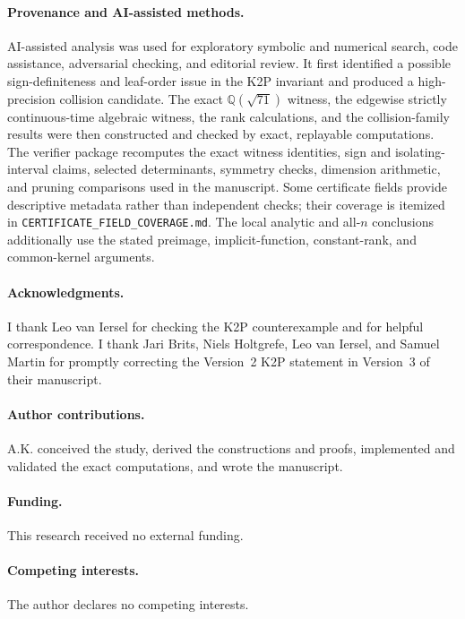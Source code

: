 \documentclass[11pt]{article}
\theoremstyle{remark}\newtheorem{remark}[theorem]{Remark}
\begin{document}
\paragraph{Provenance and AI-assisted methods.}
AI-assisted analysis was used for exploratory symbolic and numerical search, code assistance, adversarial checking, and editorial review. It first identified a possible sign-definiteness and leaf-order issue in the K2P invariant and produced a high-precision collision candidate. The exact $\mathbb Q(\sqrt{71})$ witness, the edgewise strictly continuous-time algebraic witness, the rank calculations, and the collision-family results were then constructed and checked by exact, replayable computations. The verifier package recomputes the exact witness identities, sign and isolating-interval claims, selected determinants, symmetry checks, dimension arithmetic, and pruning comparisons used in the manuscript. Some certificate fields provide descriptive metadata rather than independent checks; their coverage is itemized in \texttt{CERTIFICATE\_FIELD\_COVERAGE.md}. The local analytic and all-$n$ conclusions additionally use the stated preimage, implicit-function, constant-rank, and common-kernel arguments.

\paragraph{Acknowledgments.}
I thank Leo van Iersel for checking the K2P counterexample and for helpful correspondence. I thank Jari Brits, Niels Holtgrefe, Leo van Iersel, and Samuel Martin for promptly correcting the Version~2 K2P statement in Version~3 of their manuscript.

\paragraph{Author contributions.}
A.K. conceived the study, derived the constructions and proofs, implemented and validated the exact computations, and wrote the manuscript.

\paragraph{Funding.}
This research received no external funding.

\paragraph{Competing interests.}
The author declares no competing interests.
\end{document}
